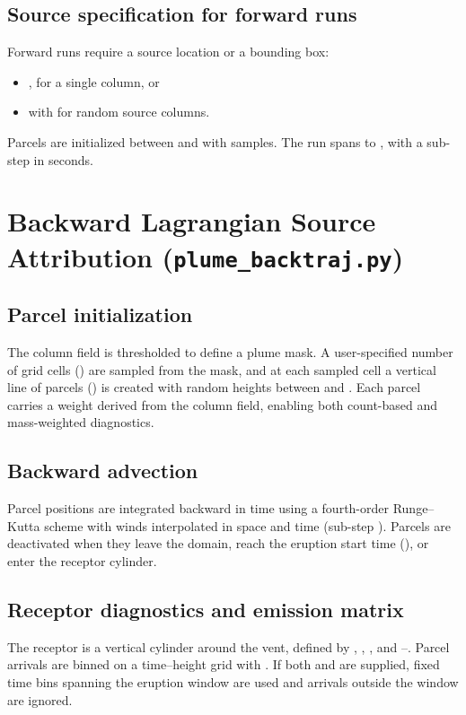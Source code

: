 \documentclass[11pt]{article}
\begin{document}
\subsection{Source specification for forward runs}
Forward runs require a source location or a bounding box:
\begin{itemize}
  \item {},  for a single column, or
  \item {} with  for random source columns.
\end{itemize}
Parcels are initialized between  and  with
 samples. The run spans  to ,
with a sub-step  in seconds.

\section{Backward Lagrangian Source Attribution (\texttt{plume\_backtraj.py})}
\subsection{Parcel initialization}
The column field is thresholded to define a plume mask. A user-specified number
of grid cells () are sampled from the mask, and at each sampled
cell a vertical line of parcels () is created with random heights
between  and . Each parcel carries a weight derived
from the column field, enabling both count-based and mass-weighted diagnostics.

\subsection{Backward advection}
Parcel positions are integrated backward in time using a fourth-order
Runge--Kutta scheme with winds interpolated in space and time (sub-step
). Parcels are deactivated when they leave the domain,
reach the eruption start time (), or enter the receptor
cylinder.

\subsection{Receptor diagnostics and emission matrix}
The receptor is a vertical cylinder around the vent, defined by
, , , and
--. Parcel arrivals are binned on
a time--height grid with . If both
 and  are supplied, fixed time bins
spanning the eruption window are used and arrivals outside the window are
ignored.
\end{document}
